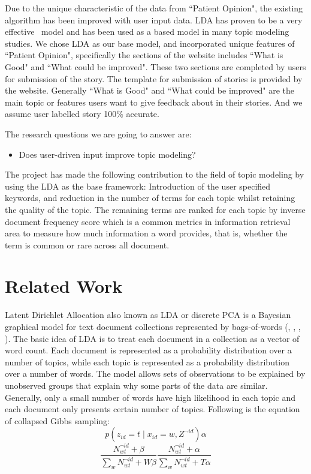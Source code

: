 \documentclass[11pt,twoside]{report}
\begin{document}
Due to the unique characteristic of the data from ``Patient Opinion", the existing 
algorithm has been improved with user input data. LDA has proven to be a 
very effective  model and has been used as a based model in many topic modeling 
studies. We chose LDA as our base model, and incorporated unique features of ``Patient Opinion", specifically the sections of the website includes ``What is Good" and 
``What could be improved". These two sections are completed by users 
for submission of the story. The template for submission of stories is 
provided by the website. Generally ``What is Good" and 
``What could be improved" are the main topic or features users want to give 
feedback about in their stories. And we assume user labelled
story 100\% accurate.

The research questions we are going to answer are:
\begin{itemize}
\item Does user-driven input improve topic modeling?
\end{itemize}

The project has made the following contribution to the field of topic modeling by using the LDA as the base framework:
Introduction of the user specified keywords, and reduction in the number of terms for each topic whilst retaining the quality of the topic. The remaining terms are ranked for each topic by inverse document frequency score which is a common metrics in information retrieval area to measure how much information a word provides, that is, whether the term is common or rare across all document. 

\chapter{Related Work}

Latent Dirichlet Allocation also known as LDA or discrete PCA is a Bayesian graphical model for text document collections represented by bags-of-words (\cite{ref26}, \cite{ref25}, \cite{ref30}, \cite{ref31}). The basic idea of LDA is to treat each document in a collection as a vector of word count. Each document is represented as a probability distribution over a number of topics, while each topic is represented as a probability distribution over a number of words. The model allows sets of observations to be explained by unobserved groups that explain why some parts of the data are similar. Generally, only a small number of words have high likelihood in each topic and each document only presents certain number of topics. Following is the equation of collapsed Gibbs sampling:
\begin{equation}
p(z_{id}=t\mid x_{id}=w,Z^{\neg id}) \alpha
\end{equation}
\begin{equation}
\frac{N_{wt}^{\neg id} + \beta}{\sum_{w}N_{wt}^{\neg id} + W\beta} \frac{N_{wt}^{\neg id} + \alpha}{\sum_{w}N_{wt}^{\neg id} + T\alpha}
\end{equation}
\end{document}
